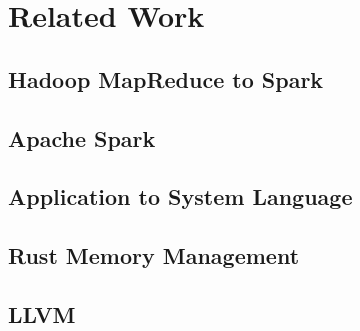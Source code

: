 \chapter{Related Work}
\label{chapter:relatedwork}
\thispagestyle{myheadings}

\graphicspath{{2_RelatedWork/Figures/}}

\section{Hadoop MapReduce to Spark}
\label{sec:hadoopspark}


\section{Apache Spark}
\label{sec:spark}


\section{Application to System Language}
\label{sec:appsys}


\section{Rust Memory Management}
\label{sec:rustmem}


\section{LLVM}
\label{sec:llvm}


% 


% 

\clearpage




